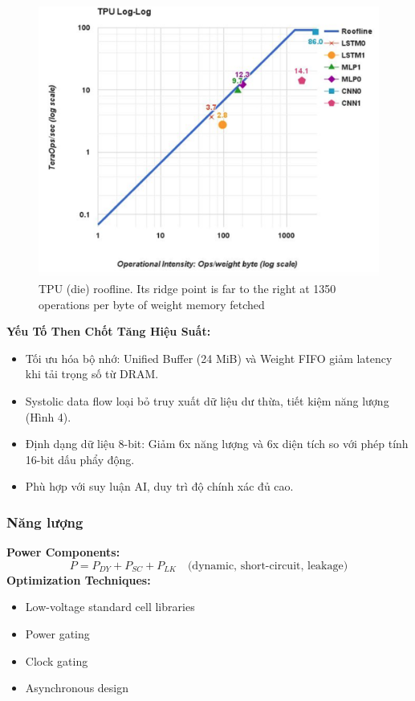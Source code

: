 \documentclass[a4paper]{article}
\begin{document}
\begin{figure}
    \centering
    \includegraphics[width=0.75\linewidth]{asic-f5.png}
    \caption{TPU (die) roofline. Its ridge point is far to the right at 1350 operations per byte of weight memory fetched}
    \label{fig:enter-label}
\end{figure}

\textbf{Yếu Tố Then Chốt Tăng Hiệu Suất:}
\begin{itemize}
    \item Tối ưu hóa bộ nhớ:
    Unified Buffer (24 MiB) và Weight FIFO giảm latency khi tải trọng số từ DRAM.
    \item Systolic data flow loại bỏ truy xuất dữ liệu dư thừa, tiết kiệm năng lượng (Hình 4).
    \item Định dạng dữ liệu 8-bit: Giảm 6x năng lượng và 6x diện tích so với phép tính 16-bit dấu phẩy động.
    \item Phù hợp với suy luận AI, duy trì độ chính xác đủ cao.
\end{itemize}
\subsubsection{Năng lượng}
\textbf{Power Components:}
\begin{equation}
    P = P_{DY} + P_{SC} + P_{LK} \quad \text{(dynamic, short-circuit, leakage)}
\end{equation}
\textbf{Optimization Techniques:}
\begin{itemize}
    \item Low-voltage standard cell libraries
    \item Power gating
    \item Clock gating
    \item Asynchronous design
\end{itemize}
\end{document}
